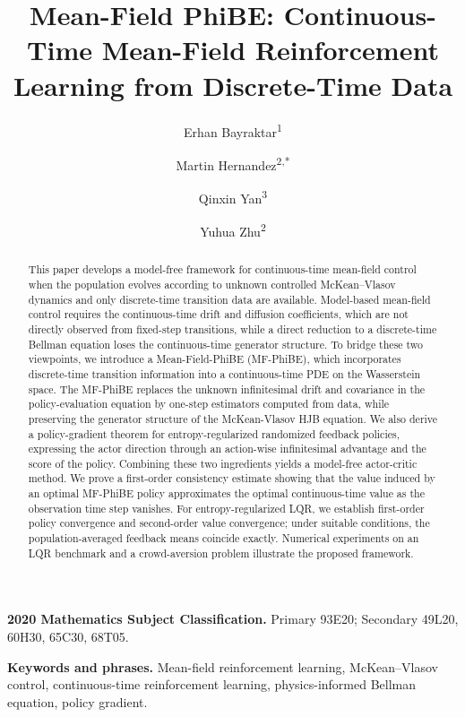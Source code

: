 \documentclass[a4paper, 10pt, english, reqno]{amsart}
\title{Mean-Field PhiBE: Continuous-Time Mean-Field Reinforcement Learning from Discrete-Time Data}
\author[E. Bayraktar]{Erhan Bayraktar\textsuperscript{1}}
\author[M. Hernandez]{Martin Hernandez\textsuperscript{2,*}}
\author[Q. Yan]{Qinxin Yan\textsuperscript{3}}
\author[Y. Zhu]{Yuhua Zhu\textsuperscript{2}}
\date{}
\begin{document}
\begin{abstract}
This paper develops a model-free framework for continuous-time mean-field control when the population evolves according to unknown controlled McKean--Vlasov dynamics and only discrete-time transition data are available. Model-based mean-field control requires the continuous-time drift and diffusion coefficients, which are not directly observed from fixed-step transitions, while a direct reduction to a discrete-time Bellman equation loses the continuous-time generator structure. To bridge these two viewpoints, we introduce a Mean-Field-PhiBE (MF-PhiBE), which incorporates discrete-time transition information into a continuous-time PDE on the Wasserstein space. The MF-PhiBE replaces the unknown infinitesimal drift and covariance in the policy-evaluation equation by one-step estimators computed from data, while preserving the generator structure of the McKean-Vlasov HJB equation. We also derive a policy-gradient theorem for entropy-regularized randomized feedback policies, expressing the actor direction through an action-wise infinitesimal advantage and the score of the policy. Combining these two ingredients yields a model-free actor-critic method. We prove a first-order consistency estimate showing that the value induced by an optimal MF-PhiBE policy approximates the optimal continuous-time value as the observation time step vanishes. For entropy-regularized LQR, we establish first-order policy convergence and second-order value convergence; under suitable conditions, the population-averaged feedback means coincide exactly. Numerical experiments on an LQR benchmark and a crowd-aversion problem illustrate the proposed framework.
\end{abstract}

\maketitle

\noindent\textbf{2020 Mathematics Subject Classification.}
Primary 93E20; Secondary 49L20, 60H30, 65C30, 68T05.

\smallskip

\noindent\textbf{Keywords and phrases.}
Mean-field reinforcement learning, McKean--Vlasov control,
continuous-time reinforcement learning, physics-informed Bellman
equation, policy gradient.

\medskip

\setcounter{tocdepth}{1}
\tableofcontents
\end{document}
